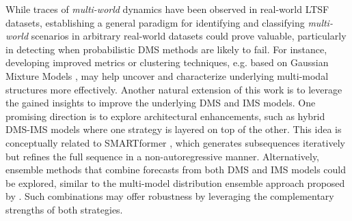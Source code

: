 \documentclass[a4paper,oneside,bibliography=totoc]{scrbook}
\begin{document}
While traces of \textit{multi-world} dynamics have been observed in real-world LTSF datasets, establishing a general paradigm for identifying and classifying \textit{multi-world} scenarios in arbitrary real-world datasets could prove valuable, particularly in detecting when probabilistic DMS methods are likely to fail. For instance, developing improved metrics or clustering techniques, e.g. based on Gaussian Mixture Models \cite{mcdowell_clustering_2018, zhang_gaussian_2021}, may help uncover and characterize underlying multi-modal structures more effectively.
%
Another natural extension of this work is to leverage the gained insights to improve the underlying DMS and IMS models. One promising direction is to explore architectural enhancements, such as hybrid DMS-IMS models where one strategy is layered on top of the other. This idea is conceptually related to SMARTformer \cite{li_smartformer_2023}, which generates subsequences iteratively but refines the full sequence in a non-autoregressive manner. 
Alternatively, ensemble methods that combine forecasts from both DMS and IMS models could be explored, similar to the multi-model distribution ensemble approach proposed by \citet{zhou_ptse_2023}. Such combinations may offer robustness by leveraging the complementary strengths of both strategies.
\end{document}
